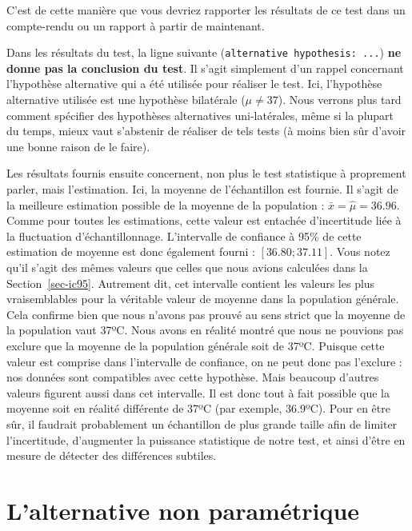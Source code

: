 \documentclass[
  a4paper,
  DIV=11,
  numbers=noendperiod,
  oneside]{scrreprt}
\begin{document}
C'est de cette manière que vous devriez rapporter les résultats de ce
test dans un compte-rendu ou un rapport à partir de maintenant.

Dans les résultats du test, la ligne suivante
(\texttt{alternative\ hypothesis:\ ...}) \textbf{ne donne pas la
conclusion du test}. Il s'agit simplement d'un rappel concernant
l'hypothèse alternative qui a été utilisée pour réaliser le test. Ici,
l'hypothèse alternative utilisée est une hypothèse bilatérale
(\(\mu \neq 37\)). Nous verrons plus tard comment spécifier des
hypothèses alternatives uni-latérales, même si la plupart du temps,
mieux vaut s'abstenir de réaliser de tels tests (à moins bien sûr
d'avoir une bonne raison de le faire).

Les résultats fournis ensuite concernent, non plus le test statistique à
proprement parler, mais l'estimation. Ici, la moyenne de l'échantillon
est fournie. Il s'agit de la meilleure estimation possible de la moyenne
de la population : \(\bar{x} = \hat{\mu} = 36.96\). Comme pour toutes
les estimations, cette valeur est entachée d'incertitude liée à la
fluctuation d'échantillonnage. L'intervalle de confiance à 95\% de cette
estimation de moyenne est donc également fourni : \([36.80 ; 37.11]\).
Vous notez qu'il s'agit des mêmes valeurs que celles que nous avions
calculées dans la Section~\ref{sec-ic95}. Autrement dit, cet intervalle
contient les valeurs les plus vraisemblables pour la véritable valeur de
moyenne dans la population générale. Cela confirme bien que nous n'avons
pas prouvé au sens strict que la moyenne de la population vaut 37ºC.
Nous avons en réalité montré que nous ne pouvions pas exclure que la
moyenne de la population générale soit de 37ºC. Puisque cette valeur est
comprise dans l'intervalle de confiance, on ne peut donc pas l'exclure :
nos données sont compatibles avec cette hypothèse. Mais beaucoup
d'autres valeurs figurent aussi dans cet intervalle. Il est donc tout à
fait possible que la moyenne soit en réalité différente de 37ºC (par
exemple, 36.9ºC). Pour en être sûr, il faudrait probablement un
échantillon de plus grande taille afin de limiter l'incertitude,
d'augmenter la puissance statistique de notre test, et ainsi d'être en
mesure de détecter des différences subtiles.

\hypertarget{lalternative-non-paramuxe9trique}{%
\section{L'alternative non
paramétrique}\label{lalternative-non-paramuxe9trique}}
\end{document}
